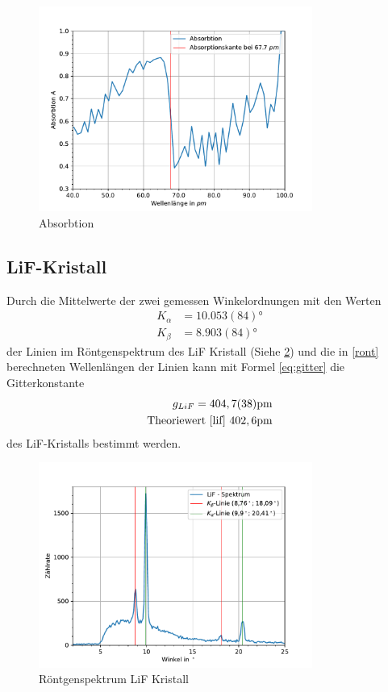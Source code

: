 \documentclass[11pt, a4paper]{article}
\begin{document}
    \begin{figure}
        \centering
        \includegraphics[width=0.8\textwidth]{Zirkonium.pdf}
        \caption{Absorbtion}
        \label{fig:trans}
    \end{figure}

    \subsection{LiF-Kristall}
    Durch die Mittelwerte der zwei gemessen Winkelordnungen mit den Werten
    \begin{align}
        K_{\alpha} &= 10.053(84) \si{\degree} \\
        K_{\beta} &= 8.903(84) \si{\degree}
    \end{align}
    der Linien im Röntgenspektrum des LiF Kristall (Siehe \ref{fig:LiF}) und die in \ref{ront} berechneten Wellenlängen der Linien kann mit Formel \ref{eq:gitter} die Gitterkonstante
    \begin{align}
        g_{LiF} = 404,7(38) \si{\pico\meter} \\
        \text{Theoriewert \cite{lif} } 402,6 \si{\pico\meter}
    \end{align}
    des LiF-Kristalls bestimmt werden.

    \begin{figure}
        \centering
        \includegraphics[width=0.8\textwidth]{LiF-Spektrum.pdf}
        \caption{Röntgenspektrum LiF Kristall}
        \label{fig:LiF}
    \end{figure}
\end{document}
